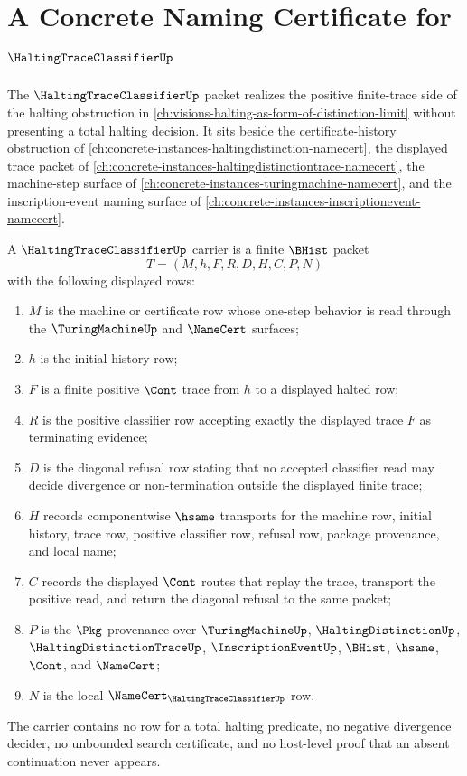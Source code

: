 \chapter{A Concrete Naming Certificate for $\HaltingTraceClassifierUp$}
\label{ch:concrete-instances-haltingtraceclassifier-namecert}

The $\HaltingTraceClassifierUp$ packet realizes the positive finite-trace side of the halting obstruction in \autoref{ch:visions-halting-as-form-of-distinction-limit} without presenting a total halting decision. It sits beside the certificate-history obstruction of \autoref{ch:concrete-instances-haltingdistinction-namecert}, the displayed trace packet of \autoref{ch:concrete-instances-haltingdistinctiontrace-namecert}, the machine-step surface of \autoref{ch:concrete-instances-turingmachine-namecert}, and the inscription-event naming surface of \autoref{ch:concrete-instances-inscriptionevent-namecert}.

\begin{definition}
\label{def:halting-trace-classifier-carrier}
A $\HaltingTraceClassifierUp$ carrier is a finite $\BHist$ packet
$$
T=(M,h,F,R,D,H,C,P,N)
$$
with the following displayed rows:
\begin{enumerate}
\item $M$ is the machine or certificate row whose one-step behavior is read through the $\TuringMachineUp$ and $\NameCert$ surfaces;
\item $h$ is the initial history row;
\item $F$ is a finite positive $\Cont$ trace from $h$ to a displayed halted row;
\item $R$ is the positive classifier row accepting exactly the displayed trace $F$ as terminating evidence;
\item $D$ is the diagonal refusal row stating that no accepted classifier read may decide divergence or non-termination outside the displayed finite trace;
\item $H$ records componentwise $\hsame$ transports for the machine row, initial history, trace row, positive classifier row, refusal row, package provenance, and local name;
\item $C$ records the displayed $\Cont$ routes that replay the trace, transport the positive read, and return the diagonal refusal to the same packet;
\item $P$ is the $\Pkg$ provenance over $\TuringMachineUp$, $\HaltingDistinctionUp$, $\HaltingDistinctionTraceUp$, $\InscriptionEventUp$, $\BHist$, $\hsame$, $\Cont$, and $\NameCert$;
\item $N$ is the local $\NameCert_{\HaltingTraceClassifierUp}$ row.
\end{enumerate}
The carrier contains no row for a total halting predicate, no negative divergence decider, no unbounded search certificate, and no host-level proof that an absent continuation never appears.
\end{definition}

